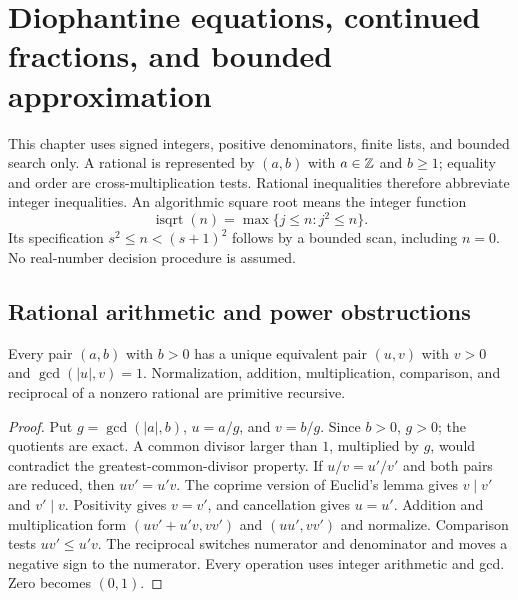 \section{Diophantine equations, continued fractions, and bounded approximation}
\label{sec:diophantine}

This chapter uses signed integers, positive denominators, finite lists, and
bounded search only. A rational is represented by $(a,b)$ with $a\in\mathbb Z$
and $b\geq1$; equality and order are cross-multiplication tests.
Rational inequalities therefore abbreviate integer inequalities.
An algorithmic square root means the integer function
\[
 \operatorname{isqrt}(n)=\max\{j\leq n:j^2\leq n\}.
\]
Its specification $s^2\leq n<(s+1)^2$ follows by a bounded scan,
including $n=0$. No real-number decision procedure is assumed.

\subsection{Rational arithmetic and power obstructions}

\begin{theorem}\label{dio:normal}
Every pair $(a,b)$ with $b>0$ has a unique equivalent pair $(u,v)$ with
$v>0$ and $\gcd(|u|,v)=1$. Normalization, addition, multiplication,
comparison, and reciprocal of a nonzero rational are primitive recursive.
\end{theorem}
\begin{proof}
Put $g=\gcd(|a|,b)$, $u=a/g$, and $v=b/g$. Since $b>0$, $g>0$;
the quotients are exact. A common divisor larger than $1$, multiplied
by $g$, would contradict the greatest-common-divisor property.
If $u/v=u'/v'$ and both pairs are reduced, then $uv'=u'v$.
The coprime version of Euclid's lemma gives $v\mid v'$ and $v'\mid v$.
Positivity gives $v=v'$, and cancellation gives $u=u'$.
Addition and multiplication form
$(uv'+u'v,vv')$ and $(uu',vv')$ and normalize.
Comparison tests $uv'\leq u'v$. The reciprocal switches numerator
and denominator and moves a negative sign to the numerator.
Every operation uses integer arithmetic and gcd. Zero becomes $(0,1)$.
\end{proof}


